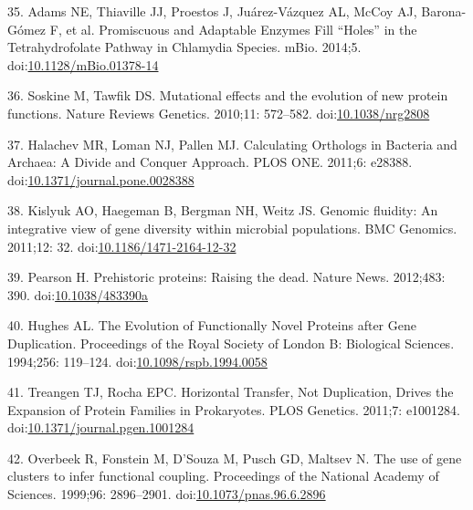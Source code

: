 \documentclass[12pt,twoside]{reedthesis}
\begin{document}
  \hypertarget{ref-adamsux5fpromiscuousux5f2014}{}
  35. Adams NE, Thiaville JJ, Proestos J, Juárez-Vázquez AL, McCoy AJ,
  Barona-Gómez F, et al. Promiscuous and Adaptable Enzymes Fill ``Holes''
  in the Tetrahydrofolate Pathway in Chlamydia Species. mBio. 2014;5.
  doi:\href{https://doi.org/10.1128/mBio.01378-14}{10.1128/mBio.01378-14}
  
  \hypertarget{ref-soskineux5fmutationalux5f2010}{}
  36. Soskine M, Tawfik DS. Mutational effects and the evolution of new
  protein functions. Nature Reviews Genetics. 2010;11: 572--582.
  doi:\href{https://doi.org/10.1038/nrg2808}{10.1038/nrg2808}
  
  \hypertarget{ref-halachevux5fcalculatingux5f2011}{}
  37. Halachev MR, Loman NJ, Pallen MJ. Calculating Orthologs in Bacteria
  and Archaea: A Divide and Conquer Approach. PLOS ONE. 2011;6: e28388.
  doi:\href{https://doi.org/10.1371/journal.pone.0028388}{10.1371/journal.pone.0028388}
  
  \hypertarget{ref-kislyukux5fgenomicux5f2011}{}
  38. Kislyuk AO, Haegeman B, Bergman NH, Weitz JS. Genomic fluidity: An
  integrative view of gene diversity within microbial populations. BMC
  Genomics. 2011;12: 32.
  doi:\href{https://doi.org/10.1186/1471-2164-12-32}{10.1186/1471-2164-12-32}
  
  \hypertarget{ref-pearsonux5fprehistoricux5f2012}{}
  39. Pearson H. Prehistoric proteins: Raising the dead. Nature News.
  2012;483: 390.
  doi:\href{https://doi.org/10.1038/483390a}{10.1038/483390a}
  
  \hypertarget{ref-hughesux5fevolutionux5f1994}{}
  40. Hughes AL. The Evolution of Functionally Novel Proteins after Gene
  Duplication. Proceedings of the Royal Society of London B: Biological
  Sciences. 1994;256: 119--124.
  doi:\href{https://doi.org/10.1098/rspb.1994.0058}{10.1098/rspb.1994.0058}
  
  \hypertarget{ref-treangenux5fhorizontalux5f2011}{}
  41. Treangen TJ, Rocha EPC. Horizontal Transfer, Not Duplication, Drives
  the Expansion of Protein Families in Prokaryotes. PLOS Genetics. 2011;7:
  e1001284.
  doi:\href{https://doi.org/10.1371/journal.pgen.1001284}{10.1371/journal.pgen.1001284}
  
  \hypertarget{ref-overbeekux5fuseux5f1999}{}
  42. Overbeek R, Fonstein M, D'Souza M, Pusch GD, Maltsev N. The use of
  gene clusters to infer functional coupling. Proceedings of the National
  Academy of Sciences. 1999;96: 2896--2901.
  doi:\href{https://doi.org/10.1073/pnas.96.6.2896}{10.1073/pnas.96.6.2896}
  
\end{document}
